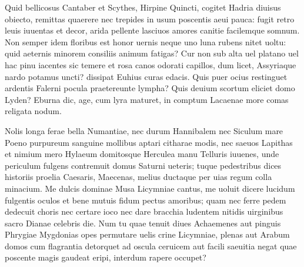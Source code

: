 \documentclass{book}
\newenvironment {carmen} [1] [\relax] 
  {\Titulus \Versus \incipit*\numerus{1}#1}
  {\endVersus}
\newcommand {\Alcaic}    {\Forma \strophae {0 \poena 01 \poena 2}}
\newcommand {\AsclA}     {\Forma \strophae {0 \poena 00 \poena 2}}
\begin{document}
\begin{carmen}[\Alcaic]


Quid bellicosus Cantaber et Scythes,
 Hirpine Quincti, cogitet Hadria
      diuisus obiecto, remittas
      quaerere nec trepides in usum 
poscentis aeui pauca: fugit retro               
 leuis iuuentas et decor, arida
      pellente lasciuos amores
      canitie facilemque somnum. 
Non semper idem floribus est honor
 uernis neque uno luna rubens nitet               
      uoltu: quid aeternis minorem
      consiliis animum fatigas? 
Cur non sub alta uel platano uel hac
 pinu iacentes sic temere et rosa
      canos odorati capillos,               
      dum licet, Assyriaque nardo 
potamus uncti? dissipat Euhius
 curas edacis. Quis puer ocius
      restinguet ardentis Falerni
      pocula praetereunte lympha?                
Quis deuium scortum eliciet domo
 Lyden? Eburna dic, age, cum lyra
      maturet, in comptum Lacaenae
      more comas religata nodum. 

\end{carmen}

\begin{carmen}[\AsclA]


Nolis longa ferae bella Numantiae,
 nec durum Hannibalem nec Siculum mare
 Poeno purpureum sanguine mollibus
      aptari citharae modis, 
nec saeuos Lapithas et nimium mero               
 Hylaeum domitosque Herculea manu
 Telluris iuuenes, unde periculum
      fulgens contremuit domus 
Saturni ueteris; tuque pedestribus
 dices historiis proelia Caesaris,               
 Maecenas, melius ductaque per uias
      regum colla minacium. 
Me dulcis dominae Musa Licymniae
 cantus, me uoluit dicere lucidum
 fulgentis oculos et bene mutuis                
     fidum pectus amoribus; 
quam nec ferre pedem dedecuit choris
 nec certare ioco nec dare bracchia
 ludentem nitidis uirginibus sacro
      Dianae celebris die.                
Num tu quae tenuit diues Achaemenes
 aut pinguis Phrygiae Mygdonias opes
 permutare uelis crine Licymniae,
      plenas aut Arabum domos 
cum flagrantia detorquet ad oscula               
 ceruicem aut facili saeuitia negat
 quae poscente magis gaudeat eripi,
      interdum rapere occupet? 

\end{carmen}
\end{document}
